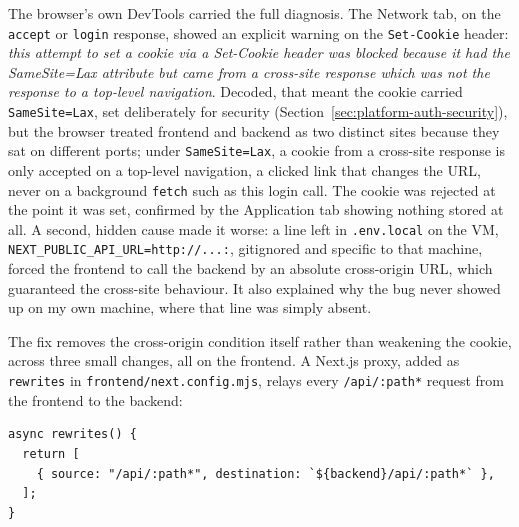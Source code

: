 The browser's own DevTools carried the full diagnosis. The Network tab, on the \texttt{accept} or \texttt{login} response, showed an explicit warning on the \texttt{Set-\allowbreak Cookie} header: \emph{this attempt to set a cookie via a Set-Cookie header was blocked because it had the SameSite=Lax attribute but came from a cross-site response which was not the response to a top-level navigation}. Decoded, that meant the cookie carried \texttt{Same\allowbreak Site=Lax}, set deliberately for security (Section~\ref{sec:platform-auth-security}), but the browser treated frontend and backend as two distinct sites because they sat on different ports; under \texttt{Same\allowbreak Site=Lax}, a cookie from a cross-site response is only accepted on a top-level navigation, a clicked link that changes the URL, never on a background \texttt{fetch} such as this login call. The cookie was rejected at the point it was set, confirmed by the Application tab showing nothing stored at all. A second, hidden cause made it worse: a line left in \texttt{.\allowbreak env.\allowbreak local} on the VM, \texttt{NEXT\_\allowbreak PUBLIC\_\allowbreak API\_\allowbreak URL=http:\allowbreak /\allowbreak /...:}, gitignored and specific to that machine, forced the frontend to call the backend by an absolute cross-origin URL, which guaranteed the cross-site behaviour. It also explained why the bug never showed up on my own machine, where that line was simply absent.

The fix removes the cross-origin condition itself rather than weakening the cookie, across three small changes, all on the frontend. A Next.js proxy, added as \texttt{rewrites} in \texttt{frontend/\allowbreak next.\allowbreak config.\allowbreak mjs}, relays every \texttt{/\allowbreak api/\allowbreak :\allowbreak path*} request from the frontend to the backend:

\begin{lstlisting}[caption={Same-origin proxy via Next.js rewrites}, label={lst:nextjs-rewrites}]
async rewrites() {
  return [
    { source: "/api/:path*", destination: `${backend}/api/:path*` },
  ];
}
\end{lstlisting}

